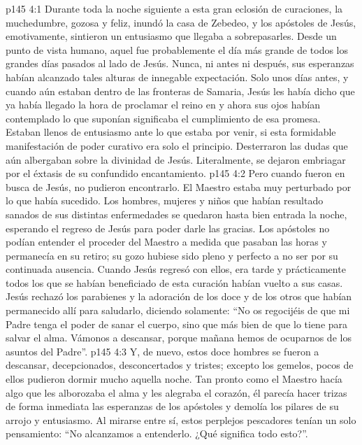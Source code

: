 \vs p145 4:1 Durante toda la noche siguiente a esta gran eclosión de curaciones, la muchedumbre, gozosa y feliz, inundó la casa de Zebedeo, y los apóstoles de Jesús, emotivamente, sintieron un entusiasmo que llegaba a sobrepasarles. Desde un punto de vista humano, aquel fue probablemente el día más grande de todos los grandes días pasados al lado de Jesús. Nunca, ni antes ni después, sus esperanzas habían alcanzado tales alturas de innegable expectación. Solo unos días antes, y cuando aún estaban dentro de las fronteras de Samaria, Jesús les había dicho que ya había llegado la hora de proclamar el reino en  y ahora sus ojos habían contemplado lo que suponían significaba el cumplimiento de esa promesa. Estaban llenos de entusiasmo ante lo que estaba por venir, si esta formidable manifestación de poder curativo era solo el principio. Desterraron las dudas que aún albergaban sobre la divinidad de Jesús. Literalmente, se dejaron embriagar por el éxtasis de su confundido encantamiento.
\vs p145 4:2 Pero cuando fueron en busca de Jesús, no pudieron encontrarlo. El Maestro estaba muy perturbado por lo que había sucedido. Los hombres, mujeres y niños que habían resultado sanados de sus distintas enfermedades se quedaron hasta bien entrada la noche, esperando el regreso de Jesús para poder darle las gracias. Los apóstoles no podían entender el proceder del Maestro a medida que pasaban las horas y permanecía en su retiro; su gozo hubiese sido pleno y perfecto a no ser por su continuada ausencia. Cuando Jesús regresó con ellos, era tarde y prácticamente todos los que se habían beneficiado de esta curación habían vuelto a sus casas. Jesús rechazó los parabienes y la adoración de los doce y de los otros que habían permanecido allí para saludarlo, diciendo solamente: “No os regocijéis de que mi Padre tenga el poder de sanar el cuerpo, sino que más bien de que lo tiene para salvar el alma. Vámonos a descansar, porque mañana hemos de ocuparnos de los asuntos del Padre”.
\vs p145 4:3 Y, de nuevo, estos doce hombres se fueron a descansar, decepcionados, desconcertados y tristes; excepto los gemelos, pocos de ellos pudieron dormir mucho aquella noche. Tan pronto como el Maestro hacía algo que les alborozaba el alma y les alegraba el corazón, él parecía hacer trizas de forma inmediata las esperanzas de los apóstoles y demolía los pilares de su arrojo y entusiasmo. Al mirarse entre sí, estos perplejos pescadores tenían un solo pensamiento: “No alcanzamos a entenderlo. ¿Qué significa todo esto?”.
